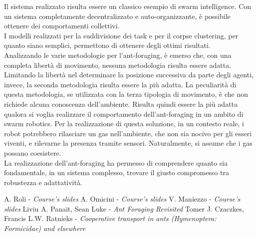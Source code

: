 \documentclass[12pt,a4paper,openright,twoside]{report}
\begin{document}
Il sistema realizzato risulta essere un classico esempio di swarm intelligence. Con un sistema completamente decentralizzato e auto-organizzante, è possibile ottenere dei comportamenti collettivi.\\
I modelli realizzati per la suddivisione dei task e per il corpse clustering, per quanto siano semplici, permettono di ottenere degli ottimi risultati.\\
Analizzando le varie metodologie per l'ant-foraging, è emerso che, con una completa libertà di movimento, nessuna metodologia risulta essere adatta. Limitando la libertà nel determinare la posizione successiva da parte degli agenti, invece, la seconda metodologia risulta essere la più adatta. La peculiarità di questa metodologia, se utilizzata con la terza tipologia di movimento, è che non richiede alcuna conoscenza dell'ambiente. Risulta quindi essere la più adatta qualora si voglia realizzare il comportamento dell'ant-foraging in un ambito di swarm robotics. Per la realizzazione di questa soluzione, in un contesto reale, i robot potrebbero rilasciare un gas nell'ambiente, che non sia nocivo per gli esseri viventi, e rilevarne la presenza tramite sensori. Naturalmente, si assume che i gas possano coesistere.\\
La realizzazione dell'ant-foraging ha permesso di comprendere quanto sia fondamentale, in un sistema complesso, trovare il giusto compromesso tra robustezza e adattatività.\\

	\clearpage{\pagestyle{empty}\cleardoublepage}
	\begin{thebibliography}{90}             %
		\rhead[\fancyplain{}{\bfseries \leftmark}]{\fancyplain{}{\bfseries
				\thepage}}
		 A. Roli - \textit{Course's slides}
		 A. Omicini - \textit{Course's slides}  
		 V. Maniezzo - \textit{Course's slides}  
		 Liviu A. Panait, Sean Luke - \textit{Ant Foraging Revisited}
		 Tomer J. Czaczkes, Francis L.W. Ratnieks - \textit{Cooperative transport in ants (Hymenoptera: Formicidae) and elsewhere}
	\end{thebibliography}
\end{document}
